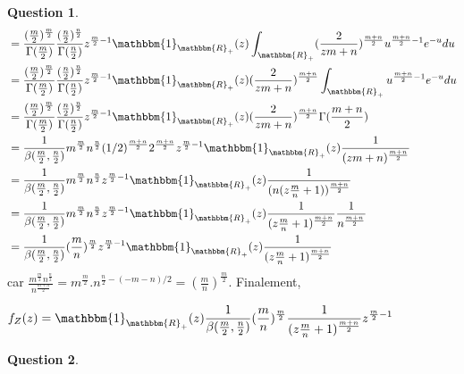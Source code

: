 \documentclass[12pt]{article}
\newcommand{\R}{\mathbbm{R}}
\newcommand{\1}{\mathbbm{1}}
\theoremstyle{definition}\newtheorem{defn}{Définition}
\theoremstyle{definition}\newtheorem{exm}{Exemple}
\theoremstyle{definition}\newtheorem{rem}{Remarque}
\theoremstyle{definition}\newtheorem{algo}{Algorithme}
\theoremstyle{remark}\newtheorem{exo}{Exercice}
\theoremstyle{remark}\newtheorem{nota}{Notation}
\theoremstyle{definition}\newtheorem{1q}{Question}
\theoremstyle{definition}\newtheorem{2q}{Question}
\theoremstyle{definition}\newtheorem{3q}{Question}
\theoremstyle{definition}\newtheorem{4q}{Question}
\theoremstyle{definition}\newtheorem{2qs1}{}
\theoremstyle{definition}\newtheorem{2qs2}{}
\theoremstyle{definition}\newtheorem{2qs3}{}
\theoremstyle{definition}\newtheorem{2qs4}{}
\theoremstyle{definition}\newtheorem{4qs2}{}
\theoremstyle{definition}\newtheorem{4qs3}{}
\begin{document}
\begin{3q}
\begin{align*}
&= \frac{(\frac{m}{2})^{\frac{m}{2}}}{\Gamma(\frac{m}{2})} \frac{(\frac{n}{2})^{\frac{n}{2}}}{\Gamma(\frac{n}{2})} z^{\frac{m}{2}-1}\1_{\R_+}(z)\int_{\R_+} (\frac{2}{zm+n})^{\frac{m+n}{2}}u^{\frac{m+n}{2}-1}e^{-u}du\\
&= \frac{(\frac{m}{2})^{\frac{m}{2}}}{\Gamma(\frac{m}{2})} \frac{(\frac{n}{2})^{\frac{n}{2}}}{\Gamma(\frac{n}{2})} z^{\frac{m}{2}-1}\1_{\R_+}(z)(\frac{2}{zm+n})^{\frac{m+n}{2}}\int_{\R_+} u^{\frac{m+n}{2}-1}e^{-u}du\\
&= \frac{(\frac{m}{2})^{\frac{m}{2}}}{\Gamma(\frac{m}{2})} \frac{(\frac{n}{2})^{\frac{n}{2}}}{\Gamma(\frac{n}{2})} z^{\frac{m}{2}-1}\1_{\R_+}(z)(\frac{2}{zm+n})^{\frac{m+n}{2}}\Gamma(\frac{m+n}{2})\\
&= \displaystyle\frac{1}{\beta(\frac{m}{2}, \frac{n}{2})}m^{\frac{m}{2}}n^{\frac{n}{2}}(1/2)^{\frac{m+n}{2}}2^{\frac{m+n}{2}}z^{\frac{m}{2}-1}\1_{\R_+}(z)\frac{1}{(zm+n)^{\frac{m+n}{2}}}\\
&= \displaystyle\frac{1}{\beta(\frac{m}{2}, \frac{n}{2})}m^{\frac{m}{2}}n^{\frac{n}{2}}z^{\frac{m}{2}-1}\1_{\R_+}(z)\frac{1}{(n(z\frac{m}{n}+1))^{\frac{m+n}{2}}}\\
&= \displaystyle\frac{1}{\beta(\frac{m}{2}, \frac{n}{2})}m^{\frac{m}{2}}n^{\frac{n}{2}}z^{\frac{m}{2}-1}\1_{\R_+}(z)\frac{1}{(z\frac{m}{n}+1)^{\frac{m+n}{2}}}\frac{1}{n^{\frac{m+n}{2}}}\\
&= \displaystyle\frac{1}{\beta(\frac{m}{2}, \frac{n}{2})}(\frac{m}{n})^{\frac{m}{2}}z^{\frac{m}{2}-1}\1_{\R_+}(z)\frac{1}{(z\frac{m}{n}+1)^{\frac{m+n}{2}}}
\end{align*}
car $\displaystyle\frac{m^{\frac{m}{2}}n^{\frac{n}{2}}}{n^{\frac{m+n}{2}}}=m^{\frac{m}{2}}.n^{\frac{n}{2} - (-m-n)/2} = (\frac{m}{n})^{\frac{m}{2}}$.\newline
Finalement, 
\begin{center}$f_Z(z) = \1_{\R_+}(z)\displaystyle\frac{1}{\beta(\frac{m}{2}, \frac{n}{2})}(\frac{m}{n})^{\frac{m}{2}}\frac{1}{(z\frac{m}{n}+1)^{\frac{m+n}{2}}}z^{\frac{m}{2}-1}$ \end{center}
\end{3q}

\begin{3q}

\end{3q}
\end{document}

